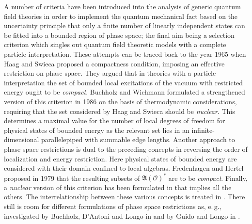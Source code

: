 \documentclass[a4paper,a4paper]{article}
\numberwithin{equation}{section}
\newcommand{\AO}{\mathfrak{A} ( \mathscr{O} )}
\theoremstyle{definition}
\theoremstyle{plain}
\theoremstyle{remark}
\theoremstyle{assumption}
\begin{document}
  A number of criteria have been introduced into the analysis of
  generic quantum field theories in order to implement the quantum
  mechanical fact based on the uncertainty principle that only a
  finite number of linearly independent states can be fitted into a
  bounded region of phase space; the final aim being a selection
  criterion which singles out quantum field theoretic models with a
  complete particle interpretation. These attempts can be traced back
  to the year 1965 when Haag and Swieca \cite{haag/swieca:1965}
  proposed a compactness condition, imposing an effective restriction
  on phase space. They argued that in theories with a particle
  interpretation the set of bounded local excitations of the vacuum
  with restricted energy ought to be \emph{compact}. Buchholz and
  Wichmann \cite{buchholz/wichmann:1986} formulated a strengthened
  version of this criterion in 1986 on the basis of thermodynamic
  considerations, requiring that the set considered by Haag and Swieca
  should be \emph{nuclear}. This determines a maximal value for the
  number of local degrees of freedom for physical states of bounded
  energy as the relevant set lies in an infinite-dimensional
  parallelepiped with summable edge lengths. Another approach to phase
  space restrictions is dual to the preceding concepts in reversing
  the order of localization and energy restriction. Here physical
  states of bounded energy are considered with their domain confined
  to local algebras. Fredenhagen and Hertel
  \cite{fredenhagen/hertel:1979} proposed in 1979 that the resulting
  subsets of $\AO^*$ are to be \emph{compact}. Finally, a
  \emph{nuclear} version of this criterion has been formulated in
  \cite{porrmann:1988} that implies all the others. The
  interrelationship between these various concepts is treated in
  \cite{buchholz/porrmann:1990}. There still is room for different
  formulations of phase space restrictions as, e.\,g., investigated
  by Buchholz, D'Antoni and Longo in
  \cite{buchholz/dantoni/longo:1990} and by Guido and Longo in
  \cite{guido/longo:2001}.
  
\end{document}

